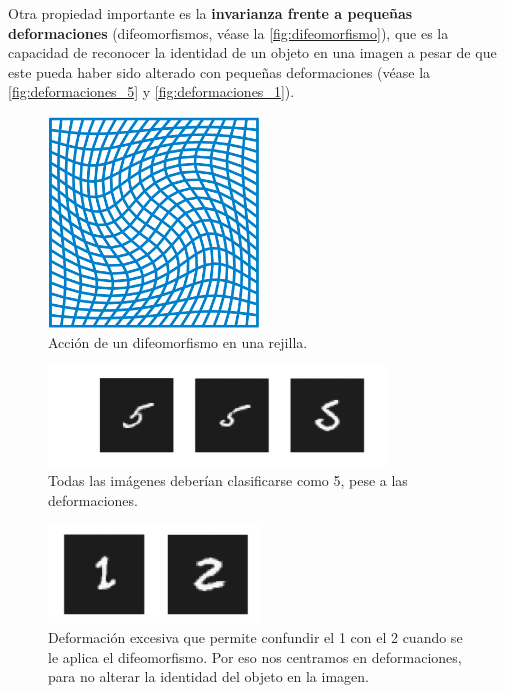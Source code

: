 \medskip

\noindent Otra propiedad importante es la \textbf{invarianza frente a pequeñas deformaciones} (difeomorfismos, véase la \autoref{fig:difeomorfismo}), que es la capacidad de reconocer la identidad de un objeto en una imagen a pesar de que este pueda haber sido alterado con pequeñas deformaciones (véase la \autoref{fig:deformaciones_5} y \autoref{fig:deformaciones_1}).


\begin{figure}[!h]
  \centering
  \includegraphics[width=0.5\textwidth]{img/Diffeomorphism.png}
  \caption{Acción de un difeomorfismo en una rejilla.}
  \label{fig:difeomorfismo}
\end{figure}

\begin{figure}[!h]
  \centering
  \includegraphics[width=0.8\textwidth]{img/5_deformado.png}
  \caption{Todas las imágenes deberían clasificarse como 5, pese a las deformaciones.}
  \label{fig:deformaciones_5}
\end{figure}

\begin{figure}[!h]
  \centering
  \includegraphics[width=0.5\textwidth]{img/1_excesivamente_deformado.png}
  \caption{Deformación excesiva que permite confundir el 1 con el 2 cuando se le aplica el difeomorfismo. Por eso nos centramos en  deformaciones, para no alterar la identidad del objeto en la imagen.}
  \label{fig:deformaciones_1}
\end{figure}

